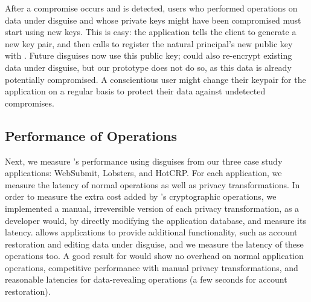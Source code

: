 %
After a compromise occurs and is detected, users who performed operations on data
under disguise and whose private keys might have been compromised must start using new
keys.
%
This is easy: the application tells the client to generate a new key pair, and then
calls  to register the natural principal's new public key with
\sys.
%
Future disguises now use this public key; \sys could also re-encrypt existing data
under disguise, but our prototype does not do so, as this data is already potentially
compromised.
%
A conscientious user might change their keypair for the application on a regular basis
to protect their data against undetected compromises.
%

\subsection{Performance of \sys Operations}
\label{s:eval-ops}

%
Next, we measure \sys's performance using disguises from our three case study
applications: WebSubmit, Lobsters, and HotCRP.
%
For each application, we measure the latency of normal operations as well as
privacy transformations.
%
In order to measure the extra cost added by \sys's cryptographic operations,
we implemented a manual, irreversible version of each privacy transformation,
as a developer would, by directly modifying the application database, and
measure its latency.
%
\sys allows applications to provide additional functionality, such as account
restoration and editing data under disguise, and we measure the latency of these
operations too.
%
A good result for \sys would show no overhead on normal application operations,
competitive performance with manual privacy transformations, and reasonable
latencies for data-revealing operations (\eg a few seconds for account
restoration).
%

